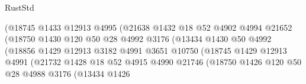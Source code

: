 \begin{lexlean}{RustStd}
\begin{coremodule}
                                      (@18745
                                        @1433
                                        @12913
                                        @4995
                                        (@21638
                                          @1432
                                          @18
                                          @52
                                          @4902
                                          @4994
                                          @21652
                                          (@18750
                                            @1430
                                            @120
                                            @50
                                            @28
                                            @4992
                                            @3176
                                            (@13434
                                              @1430
                                              @50
                                              @4992
                                              (@18856
                                                @1429
                                                @12913
                                                @3182
                                                @4991
                                                @3651
                                                @10750
                                                (@18745
                                                  @1429
                                                  @12913
                                                  @4991
                                                  (@21732
                                                    @1428
                                                    @18
                                                    @52
                                                    @4915
                                                    @4990
                                                    @21746
                                                    (@18750
                                                      @1426
                                                      @120
                                                      @50
                                                      @28
                                                      @4988
                                                      @3176
                                                      (@13434
                                                        @1426

\end{coremodule}
\end{lexlean}
